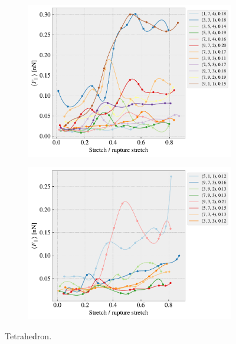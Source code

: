 \begin{figure}[H]
\begin{subfigure}[b]{0.49\textwidth}
        \includegraphics[width=\textwidth]{figures/stretch_profiles/popup/SP_4_popup.pdf}
        \caption{}
        \label{fig:}
    \end{subfigure}
    \hfill
    \begin{subfigure}[b]{0.49\textwidth}
        \centering
        \includegraphics[width=\textwidth]{figures/stretch_profiles/popup/SP_5_popup.pdf}
        \caption{}
        \label{fig:}
    \end{subfigure}
    \hfill
    \caption{Tetrahedron.}
    \label{fig:}
\end{figure}



